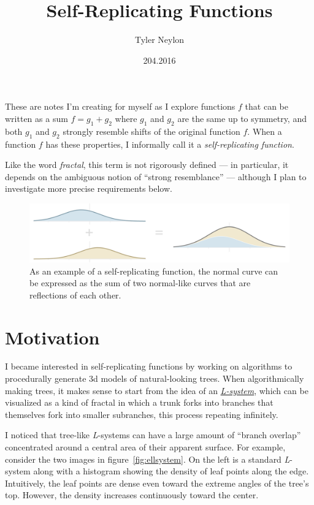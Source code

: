 \documentclass[20pt,]{extarticle}
\title{Self-Replicating Functions}
\author{Tyler Neylon}
\date{204.2016}
\begin{document}
\maketitle

\newcommand{\R}{\mathbb{R}}
\newcommand{\eqnset}[1]{\left.\mbox{$#1$}\quad\quad\right\rbrace}

These are notes I'm creating for myself as I explore functions \(f\)
that can be written as a sum \(f = g_1 + g_2\) where \(g_1\) and \(g_2\)
are the same up to symmetry, and both \(g_1\) and \(g_2\) strongly
resemble shifts of the original function \(f\). When a function \(f\)
has these properties, I informally call it a \emph{self-replicating
function}.

Like the word \emph{fractal}, this term is not rigorously defined --- in
particular, it depends on the ambiguous notion of ``strong resemblance''
--- although I plan to investigate more precise requirements below.

\begin{figure}[htbp]
\centering
\includegraphics{images/added_normals4.png}
\caption{\label{fig:added_normals}As an example of a self-replicating
function, the normal curve can be expressed as the sum of two
normal-like curves that are reflections of each
other.}\label{fig:addedux5fnormals}
\end{figure}

\section{Motivation}\label{motivation}

I became interested in self-replicating functions by working on
algorithms to procedurally generate 3d models of natural-looking trees.
When algorithmically making trees, it makes sense to start from the idea
of an \href{https://en.wikipedia.org/wiki/L-system}{\emph{L-system}},
which can be visualized as a kind of fractal in which a trunk forks into
branches that themselves fork into smaller subranches, this process
repeating infinitely.

I noticed that tree-like \emph{L}-systems can have a large amount of
``branch overlap'' concentrated around a central area of their apparent
surface. For example, consider the two images in
figure~\ref{fig:ellsystem}. On the left is a standard \emph{L}-system
along with a histogram showing the density of leaf points along the
edge. Intuitively, the leaf points are dense even toward the extreme
angles of the tree's top. However, the density increases continuously
toward the center.
\end{document}
